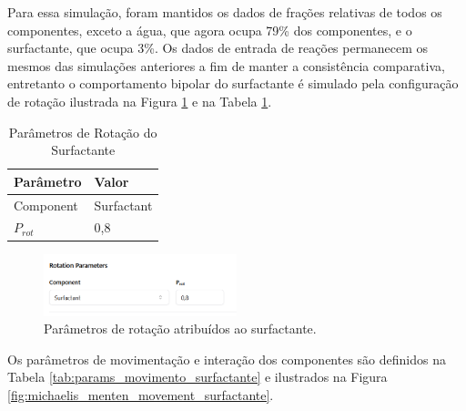 \documentclass[12pt,oneside]{report}
\begin{document}
Para essa simulação, foram mantidos os dados de frações relativas de todos os componentes, exceto a água, que agora ocupa 79\% dos componentes, e o surfactante, que ocupa 3\%. Os dados de entrada de reações permanecem os mesmos das simulações anteriores a fim de manter a consistência comparativa, entretanto o comportamento bipolar do surfactante é simulado pela configuração de rotação ilustrada na Figura \ref{fig:rotation_surfactant} e na Tabela \ref{tab:rotation_surfactant}.

\begin{table}[H]
    \centering
    \caption{Parâmetros de Rotação do Surfactante}
    \vspace{0.2cm}
    \begin{tabularx}{\textwidth}{X m{5cm}}
        \hline
        \textbf{Parâmetro}                     & \textbf{Valor}   \\
        \hline
        Component & Surfactant \\
        $P_{rot}$ & 0{,}8 \\
        \hline
    \end{tabularx}
    \vspace{0.2cm}
    \label{tab:rotation_surfactant}
\end{table}

\begin{figure}[H]
    \centering
    \includegraphics[width=0.5\textwidth]{rotation_surfactant.png}
    \caption{\small Parâmetros de rotação atribuídos ao surfactante.}
    \label{fig:rotation_surfactant}
\end{figure}

Os parâmetros de movimentação e interação dos componentes são definidos na Tabela \ref{tab:params_movimento_surfactante} e ilustrados na Figura \ref{fig:michaelis_menten_movement_surfactante}.
\end{document}
